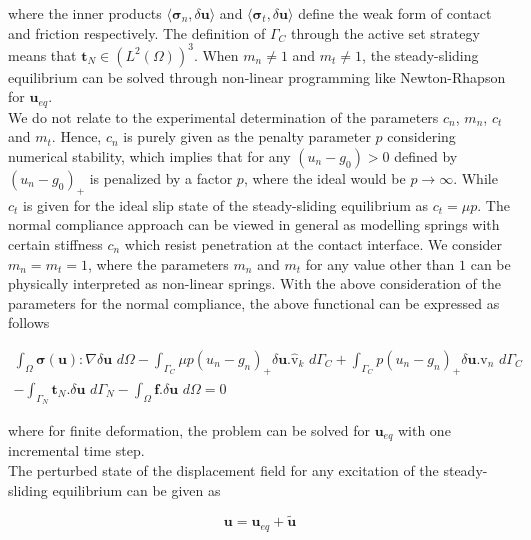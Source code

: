 where the inner products ${\langle \bm{\sigma}_n, \delta \bm u \rangle}$ and ${\langle \bm{\sigma}_t, \delta \bm u \rangle}$ define the  weak form of contact and friction respectively. 
The definition of $\Gamma_C$ through the active set strategy means that $\bm{t}_N \in (L^2(\Omega))^3$. 
 When $m_n \neq 1$ and $m_t \neq 1$, the steady-sliding equilibrium can be solved through non-linear programming like Newton-Rhapson for $\bm{u}_{eq}$.\\ 
 
We do not relate to the experimental determination of the parameters $c_n$, $m_n$, $c_t$ and $m_t$. Hence, $c_n$ is purely given as the penalty parameter $\mathit{p}$ considering numerical stability, which implies that for any $(u_n-g_0) > 0$ defined by $(u_n-g_0)_+$ is penalized by a factor $p$, where the ideal would be $ \mathit{p} \rightarrow \infty$. 
While $c_t$ is given for the ideal slip state of the steady-sliding equilibrium as $c_t=\mu\mathit{p}$. 
The normal compliance approach can be viewed in general as modelling springs with certain stiffness $c_n$ which resist penetration at the contact interface. 
We consider $m_n = m_t = 1$, where the parameters $m_n$ and $m_t$ for any value other than $1$ can be physically interpreted as non-linear springs. 
With the above consideration of the parameters for the normal compliance, the above functional can be expressed as follows

 \begin{multline}\label{SS_pen_1}
\int_{\Omega}  \bm{\sigma}(\bm{u}):\nabla \delta \bm{u} \,\,d\Omega - \int_{\Gamma_C} \mu\mathit{p}(u_n-g_n)_+\delta \bm{u}.\bm{\hat{\mathrm v}}_k \,\, d\Gamma_C + \int_{\Gamma_C} \mathit{p}(u_n-g_n)_+\delta \bm{u}.\bm{\hat{\mathrm v}}_n \,\, d\Gamma_C\\
  -  \int_{\Gamma_N} \bm{t}_N.\delta \bm{u} \,\, d\Gamma_N- \int_{\Omega} \bm{f}.\delta \bm{u} \,\, d\Omega = 0
\end{multline}




where for finite deformation, the problem can be solved for $\bm{u}_{eq}$ with one incremental time step.\\

The perturbed state of the displacement field for any excitation of the steady-sliding equilibrium can be given as 

\begin{equation}\label{pert_wrt_eq}
\bm{u}=\bm{u}_{eq}+\bm{\widetilde{u}}
\end{equation}

